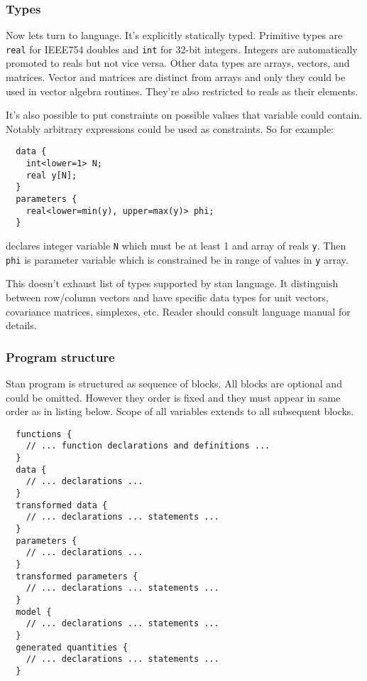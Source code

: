\documentclass[a4paper]{article}
\begin{document}
\subsubsection{Types} %

Now lets turn to language. It's explicitly statically typed. Primitive types are
\texttt{real} for IEEE754 doubles and \texttt{int} for 32-bit integers. Integers
are automatically promoted to reals but not vice versa. Other data types are
arrays, vectors, and matrices. Vector and matrices are distinct from arrays and
only they could be used in vector algebra routines. They're also restricted to
reals as their elements.

It's also possible to put constraints on possible values that variable could
contain. Notably arbitrary expressions could be used as constraints. So for
example:

\begin{verbatim}
  data {
    int<lower=1> N;
    real y[N];
  }
  parameters {
    real<lower=min(y), upper=max(y)> phi;
  }
\end{verbatim}

declares integer variable \texttt{N} which must be at least 1 and array of reals
\texttt{y}. Then \texttt{phi} is parameter variable which is constrained be in
range of values in \texttt{y} array.

This doesn't exhaust list of types supported by stan language. It distinguish
between row/column vectors and have specific data types for unit vectors,
covariance matrices, simplexes, etc. Reader should consult language
manual\cite{t2015stan} for details.

\subsubsection{Program structure} %

Stan program is structured as sequence of blocks. All blocks are optional and
could be omitted. However they order is fixed and they must appear in same order
as in listing below. Scope of all variables extends to all subsequent blocks.

\begin{verbatim}
  functions {
    // ... function declarations and definitions ...
  }
  data {
    // ... declarations ...
  }
  transformed data {
    // ... declarations ... statements ...
  }
  parameters {
    // ... declarations ...
  }
  transformed parameters {
    // ... declarations ... statements ...
  }
  model {
    // ... declarations ... statements ...
  }
  generated quantities {
    // ... declarations ... statements ...
  }
\end{verbatim}
\end{document}
